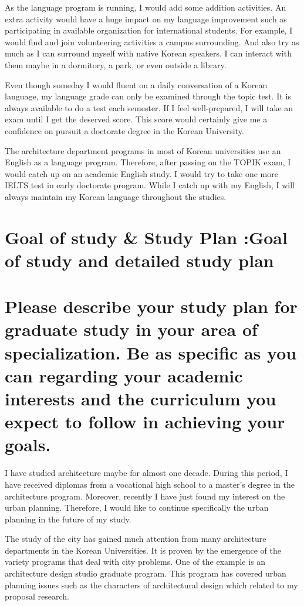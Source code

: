 \documentclass[../main.tex]{subfiles}
\begin{document}
As the language program is running, I would add some addition activities. An extra activity would have a huge impact on my language improvement such as participating in available organization for international students.
For example, I would find and join volunteering activities a campus surrounding. And also try as much as I can surround myself with native Korean speakers. I can interact with them maybe in a dormitory, a park, or even outside a library.

Even though someday I would fluent on a daily conversation of a Korean language, my language grade can only be examined through the topic test. It is always available to do a test each semester. If I feel well-prepared, I will take an exam until I get the deserved score. This score would certainly give me a confidence on pursuit a doctorate degree in the Korean University.

The architecture department programs in most of Korean universities use an English as a language program. Therefore, after passing on the TOPIK exam, I would catch up on an academic English study. I would try to take one more IELTS test in early doctorate program. While I catch up with my English, I will always maintain my Korean language throughout the studies.


\section{Goal of study \& Study Plan :Goal of study and detailed study plan}
\section*{Please describe your study plan for graduate study in your area of specialization. Be as specific as you can regarding your academic interests and the curriculum you expect to follow in achieving your goals.}

I have studied architecture maybe for almost one decade. During this period, I have received diplomas from a vocational high school to a master's degree in the architecture program.
Moreover, recently I have just found my interest on the urban planning. Therefore, I would like to continue specifically the urban planning in the future of my study.

The study of the city has gained much attention from many architecture departments in the Korean Universities. It is proven by the emergence of the variety programs that deal with city problems. One of the example is an architecture design studio graduate program. This program has covered urban planning issues such as the characters of architectural design which related to my proposal research.
\end{document}
